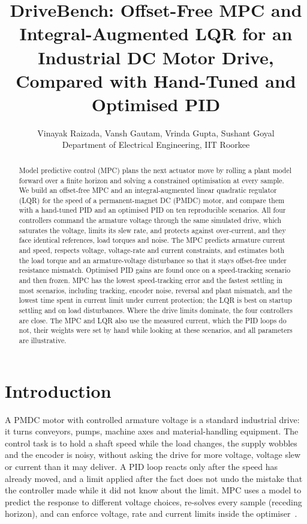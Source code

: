 \documentclass[11pt,a4paper]{article}
\title{%
  DriveBench: Offset-Free MPC and Integral-Augmented LQR for an Industrial DC Motor Drive,\\
  Compared with Hand-Tuned and Optimised PID}
\author{%
  Vinayak Raizada, Vansh Gautam, Vrinda Gupta, Sushant Goyal\\
  Department of Electrical Engineering, IIT Roorkee}
\date{}
\begin{document}
\maketitle
\thispagestyle{empty}

\begin{abstract}
Model predictive control (MPC) plans the next actuator move by rolling a plant model forward over a finite horizon and solving a constrained optimisation at every sample.
We build an offset-free MPC and an integral-augmented linear quadratic regulator (LQR) for the speed of a permanent-magnet DC (PMDC) motor, and compare them with a hand-tuned PID and an optimised PID on ten reproducible scenarios.
All four controllers command the armature voltage through the same simulated drive, which saturates the voltage, limits its slew rate, and protects against over-current, and they face identical references, load torques and noise.
The MPC predicts armature current and speed, respects voltage, voltage-rate and current constraints, and estimates both the load torque and an armature-voltage disturbance so that it stays offset-free under resistance mismatch.
Optimised PID gains are found once on a speed-tracking scenario and then frozen.
MPC has the lowest speed-tracking error and the fastest settling in most scenarios, including tracking, encoder noise, reversal and plant mismatch, and the lowest time spent in current limit under current protection; the LQR is best on startup settling and on load disturbances.
Where the drive limits dominate, the four controllers are close.
The MPC and LQR also use the measured current, which the PID loops do not, their weights were set by hand while looking at these scenarios, and all parameters are illustrative.
\end{abstract}

\section{Introduction}
A PMDC motor with controlled armature voltage is a standard industrial drive: it turns conveyors, pumps, machine axes and material-handling equipment.
The control task is to hold a shaft speed while the load changes, the supply wobbles and the encoder is noisy, without asking the drive for more voltage, voltage slew or current than it may deliver.
A PID loop reacts only after the speed has already moved, and a limit applied after the fact does not undo the mistake that the controller made while it did not know about the limit.
MPC uses a model to predict the response to different voltage choices, re-solves every sample (receding horizon), and can enforce voltage, rate and current limits inside the optimiser~\cite{rawlings2017,camacho2013}.
\end{document}

